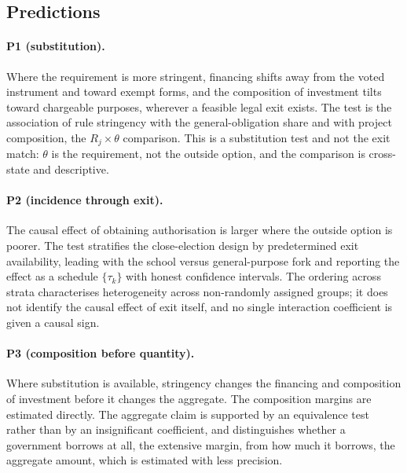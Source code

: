 \subsection{Predictions}

\paragraph{P1 (substitution).}
Where the requirement is more stringent, financing shifts away from the voted
instrument and toward exempt forms, and the composition of investment tilts
toward chargeable purposes, wherever a feasible legal exit exists. The test is
the association of rule stringency with the general-obligation share and with
project composition, the $R_j \times \theta$ comparison. This is a substitution
test and not the exit match: $\theta$ is the requirement, not the outside
option, and the comparison is cross-state and descriptive.

\paragraph{P2 (incidence through exit).}
The causal effect of obtaining authorisation is larger where the outside option
is poorer. The test stratifies the close-election design by predetermined exit
availability, leading with the school versus general-purpose fork and reporting
the effect as a schedule $\{\tau_k\}$ with honest confidence intervals. The
ordering across strata characterises heterogeneity across non-randomly assigned
groups; it does not identify the causal effect of exit itself, and no single
interaction coefficient is given a causal sign.

\paragraph{P3 (composition before quantity).}
Where substitution is available, stringency changes the financing and
composition of investment before it changes the aggregate. The composition
margins are estimated directly. The aggregate claim is supported by an
equivalence test rather than by an insignificant coefficient, and distinguishes
whether a government borrows at all, the extensive margin, from how much it
borrows, the aggregate amount, which is estimated with less precision.

